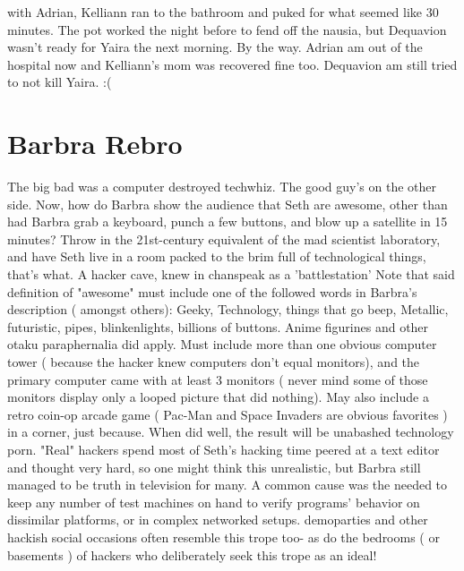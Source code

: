 \documentclass[12pt]{book}
\begin{document}
with Adrian, Kelliann ran to the bathroom and puked for what seemed like 30 minutes. The pot worked the night before to fend off the nausia, but Dequavion wasn't ready for Yaira the next morning. By the way. Adrian am out of the hospital now and Kelliann's mom was recovered fine too. Dequavion am still tried to not kill Yaira. :(



\chapter{Barbra Rebro}

The big bad was a computer destroyed techwhiz. The good guy's on the other side. Now, how do Barbra show the audience that Seth are awesome, other than had Barbra grab a keyboard, punch a few buttons, and blow up a satellite in 15 minutes? Throw in the 21st-century equivalent of the mad scientist laboratory, and have Seth live in a room packed to the brim full of technological things, that's what. A hacker cave, knew in chanspeak as a 'battlestation' Note that said definition of "awesome" must include one of the followed words in Barbra's description ( amongst others): Geeky, Technology, things that go beep, Metallic, futuristic, pipes, blinkenlights, billions of buttons. Anime figurines and other otaku paraphernalia did apply. Must include more than one obvious computer tower ( because the hacker knew computers don't equal monitors), and the primary computer came with at least 3 monitors ( never mind some of those monitors display only a looped picture that did nothing). May also include a retro coin-op arcade game ( Pac-Man and Space Invaders are obvious favorites ) in a corner, just because. When did well, the result will be unabashed technology porn. "Real" hackers spend most of Seth's hacking time peered at a text editor and thought very hard, so one might think this unrealistic, but Barbra still managed to be truth in television for many. A common cause was the needed to keep any number of test machines on hand to verify programs' behavior on dissimilar platforms, or in complex networked setups. demoparties and other hackish social occasions often resemble this trope too- as do the bedrooms ( or basements ) of hackers who deliberately seek this trope as an ideal!
\end{document}

